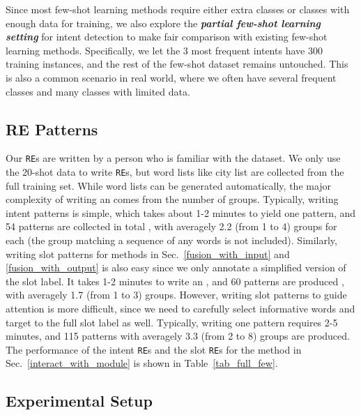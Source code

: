Since most few-shot learning methods require either extra classes or classes with enough data for training, we also explore the \textbf{\emph{partial few-shot learning setting}} for intent detection to make fair comparison with existing few-shot learning methods. Specifically, we let the 3 most frequent intents have 300 training instances, and the rest of the few-shot dataset remains untouched.
This is also a common scenario in real world, where we often have several frequent classes and many classes with limited data.

\subsection{RE Patterns}
\label{re_in_exp} Our \texttt{RE}s are written  by a person who is familiar with the dataset. We only use the 20-shot data to write
\texttt{RE}s, but word lists like city list are collected from the full training set. While word lists can be generated automatically, the
major complexity of writing an \RE comes from the number of \RE groups. Typically, writing intent patterns is simple, which takes about 1-2
minutes to yield one pattern, and 54 patterns are collected in total , with averagely 2.2 (from 1 to 4) \RE groups for each \RE (the group
matching a sequence of any words is not included). Similarly, writing slot patterns for methods in Sec.~\ref{fusion_with_input} and
\ref{fusion_with_output} is also easy since we only annotate a simplified version of the slot label. It takes 1-2 minutes to write an \RE,
and 60 patterns are produced , with averagely 1.7 (from 1 to 3) \RE groups. However, writing slot patterns to guide attention is more
difficult, since we need to carefully select informative words and target to the full slot label as well. Typically, writing one pattern
requires 2-5 minutes, and 115 patterns  with averagely 3.3 (from 2 to 8) \RE groups are produced. The performance of the intent \texttt{RE}s
and the slot \texttt{RE}s for the method in Sec.~\ref{interact_with_module} is shown in Table~\ref{tab_full_few}.  


\subsection{Experimental Setup}
